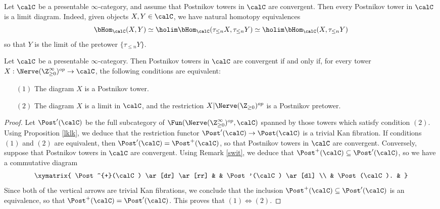 \begin{remark}\label{swit}
Let $\calC$ be a presentable $\infty$-category, and assume that Postnikov towers in $\calC$
are convergent. Then every Postnikov tower in $\calC$ is a limit diagram. Indeed, given
objects $X, Y \in \calC$, we have natural homotopy equivalences
$$ \bHom_{\calC}( X,Y) \simeq \holim \bHom_{\calC}( \tau_{\leq n} X, \tau_{\leq n} Y)
\simeq \holim \bHom_{\calC}( X, \tau_{\leq n} Y)$$
so that $Y$ is the limit of the pretower $\{ \tau_{\leq n} Y\}$.
\end{remark}

\begin{proposition}\label{slibe1}
Let $\calC$ be a presentable $\infty$-category. Then Postnikov towers in $\calC$ are convergent if and only if, for every tower $X: \Nerve( \Z^{\infty}_{\geq 0})^{op} \rightarrow \calC$, 
the following conditions are equivalent:
\begin{itemize}
\item[$(1)$] The diagram $X$ is a Postnikov tower.
\item[$(2)$] The diagram $X$ is a limit in $\calC$, and the restriction
$X| \Nerve( \Z_{\geq 0})^{op}$ is a Postnikov pretower.
\end{itemize}
\end{proposition}

\begin{proof}
Let $\Post'(\calC)$ be the full subcategory of $\Fun( \Nerve( \Z^{\infty}_{\geq 0})^{op}, \calC)$ spanned by those towers which satisfy condition $(2)$. Using Proposition \ref{lklk}, we deduce that the restriction functor $\Post'(\calC) \rightarrow \Post(\calC)$ is a trivial Kan fibration. If
conditions $(1)$ and $(2)$ are equivalent, then $\Post'(\calC) = \Post^{+}(\calC)$, so that
Postnikov towers in $\calC$ are convergent. Conversely, suppose that
Postnikov towers in $\calC$ are convergent. Using Remark \ref{swit}, we deduce that
$\Post^{+}(\calC) \subseteq \Post'(\calC)$, so we have a commutative diagram
$$ \xymatrix{ \Post^{+}(\calC) \ar[dr] \ar[rr] & & \Post'(\calC) \ar[dl] \\
& \Post(\calC). & }$$
Since both of the vertical arrows are trivial Kan fibrations, we conclude that the inclusion
$\Post^{+}(\calC) \subseteq \Post'(\calC)$ is an equivalence, so that
$\Post^{+}(\calC) = \Post'(\calC)$. This proves that $(1) \Leftrightarrow (2)$.
\end{proof}

